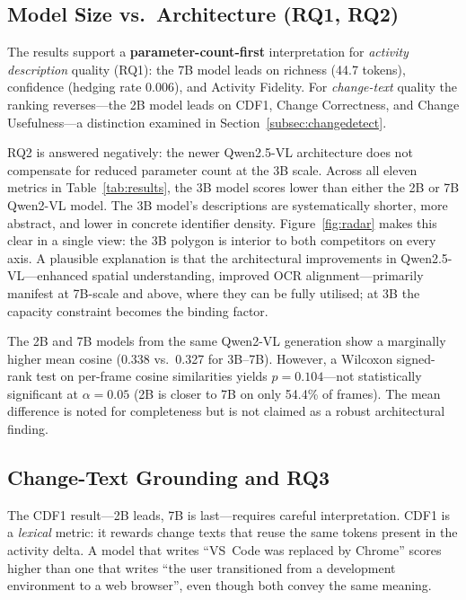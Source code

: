 \documentclass[10pt, twocolumn]{article}
\begin{document}
\subsection{Model Size vs.\ Architecture (RQ1, RQ2)}

The results support a \textbf{parameter-count-first} interpretation for
\emph{activity description} quality (RQ1): the 7B model leads on richness (44.7 tokens),
confidence (hedging rate 0.006), and Activity Fidelity. For \emph{change-text} quality
the ranking reverses---the 2B model leads on CDF1, Change Correctness, and Change
Usefulness---a distinction examined in Section~\ref{subsec:changedetect}.

RQ2 is answered negatively: the newer Qwen2.5-VL architecture does not compensate
for reduced parameter count at the 3B scale. Across all eleven metrics in
Table~\ref{tab:results}, the 3B model scores lower than either the 2B or 7B
Qwen2-VL model. The 3B model's descriptions are systematically shorter, more
abstract, and lower in concrete identifier density. Figure~\ref{fig:radar} makes
this clear in a single view: the 3B polygon is interior to both competitors on
every axis. A plausible explanation is that the architectural improvements in
Qwen2.5-VL---enhanced spatial understanding, improved OCR alignment---primarily
manifest at 7B-scale and above, where they can be fully utilised; at 3B the
capacity constraint becomes the binding factor.

The 2B and 7B models from the same Qwen2-VL generation show a marginally higher
mean cosine (0.338 vs.\ 0.327 for 3B--7B). However, a Wilcoxon signed-rank test
on per-frame cosine similarities yields $p = 0.104$---not statistically significant
at $\alpha = 0.05$ (2B is closer to 7B on only 54.4\% of frames). The mean
difference is noted for completeness but is not claimed as a robust architectural
finding.

\subsection{Change-Text Grounding and RQ3}

The CDF1 result---2B leads, 7B is last---requires careful interpretation. CDF1 is a
\emph{lexical} metric: it rewards change texts that reuse the same tokens present in
the activity delta. A model that writes ``VS~Code was replaced by Chrome'' scores
higher than one that writes ``the user transitioned from a development environment to
a web browser'', even though both convey the same meaning.
\end{document}
